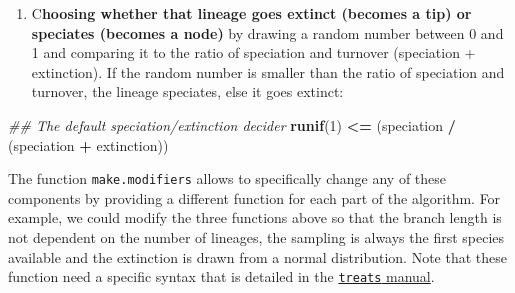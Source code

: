 \documentclass[
]{article}
\newenvironment{Shaded}{\begin{snugshade}}{\end{snugshade}}
\newcommand{\CommentTok}[1]{\textcolor[rgb]{0.56,0.35,0.01}{\textit{#1}}}
\newcommand{\DecValTok}[1]{\textcolor[rgb]{0.00,0.00,0.81}{#1}}
\newcommand{\KeywordTok}[1]{\textcolor[rgb]{0.13,0.29,0.53}{\textbf{#1}}}
\newcommand{\NormalTok}[1]{#1}
\newcommand{\OperatorTok}[1]{\textcolor[rgb]{0.81,0.36,0.00}{\textbf{#1}}}
\newcommand{\StringTok}[1]{\textcolor[rgb]{0.31,0.60,0.02}{#1}}
\providecommand{\tightlist}{%
  \setlength{\itemsep}{0pt}\setlength{\parskip}{0pt}}
\begin{document}
\begin{enumerate}
\def\labelenumi{\arabic{enumi}.}
\setcounter{enumi}{2}
\tightlist
\item
  C\textbf{hoosing whether that lineage goes extinct (becomes a tip) or
  speciates (becomes a node)} by drawing a random number between 0 and 1
  and comparing it to the ratio of speciation and turnover (speciation +
  extinction). If the random number is smaller than the ratio of
  speciation and turnover, the lineage speciates, else it goes extinct:
\end{enumerate}

\begin{Shaded}
\begin{Highlighting}[]
\CommentTok{\#\# The default speciation/extinction decider}
\KeywordTok{runif}\NormalTok{(}\DecValTok{1}\NormalTok{) }\OperatorTok{\textless{}=}\StringTok{ }\NormalTok{(speciation }\OperatorTok{/}\StringTok{ }\NormalTok{(speciation }\OperatorTok{+}\StringTok{ }\NormalTok{extinction))}
\end{Highlighting}
\end{Shaded}

The function \texttt{make.modifiers} allows to specifically change any
of these components by providing a different function for each part of
the algorithm. For example, we could modify the three functions above so
that the branch length is not dependent on the number of lineages, the
sampling is always the first species available and the extinction is
drawn from a normal distribution. Note that these function need a
specific syntax that is detailed in the
\href{http://tguillerme.github.io/treats.html}{\texttt{treats} manual}.
\end{document}
